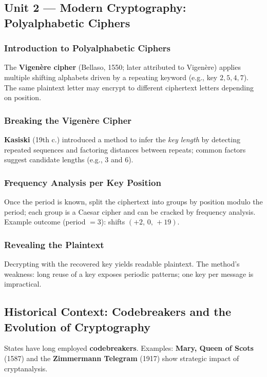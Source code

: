 \subsection{Unit 2 — Modern Cryptography: Polyalphabetic Ciphers}

\subsubsection{Introduction to Polyalphabetic Ciphers}

The \textbf{Vigenère cipher} (Bellaso, 1550; later attributed to Vigenère) applies multiple shifting alphabets driven by a repeating keyword (e.g., key \(2,5,4,7\)). The same plaintext letter may encrypt to different ciphertext letters depending on position.

\subsubsection{Breaking the Vigenère Cipher}

\textbf{Kasiski} (19th c.) introduced a method to infer the \emph{key length} by detecting repeated sequences and factoring distances between repeats; common factors suggest candidate lengths (e.g., \(3\) and \(6\)).

\subsubsection{Frequency Analysis per Key Position}

Once the period is known, split the ciphertext into groups by position modulo the period; each group is a Caesar cipher and can be cracked by frequency analysis. Example outcome (period \(=3\)): shifts \((+2,\,0,\,+19)\).

\subsubsection{Revealing the Plaintext}

Decrypting with the recovered key yields readable plaintext. The method’s weakness: long reuse of a key exposes periodic patterns; one key per message is impractical.

\subsection{Historical Context: Codebreakers and the Evolution of Cryptography}

States have long employed \textbf{codebreakers}. Examples: \textbf{Mary, Queen of Scots} (1587) and the \textbf{Zimmermann Telegram} (1917) show strategic impact of cryptanalysis.


